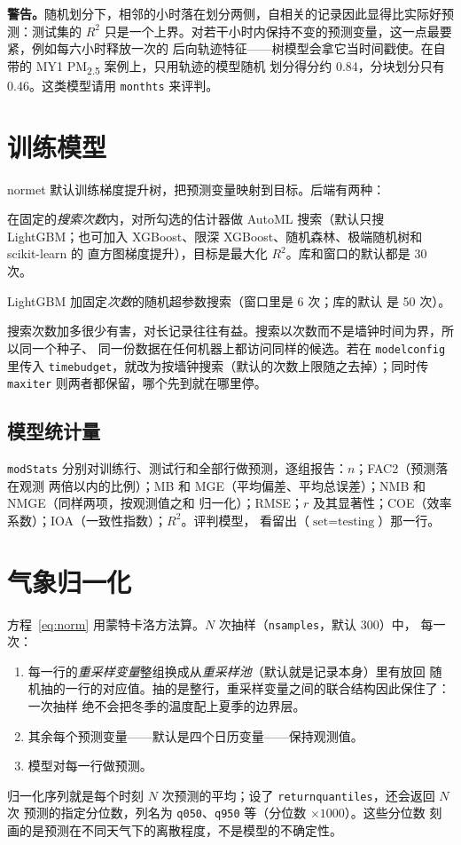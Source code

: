 \documentclass[11pt]{ctexrep}
\newcommand{\nosep}{\setlength{\itemsep}{0pt}\setlength{\parskip}{0pt}\setlength{\topsep}{2pt}}
\newcommand{\nm}{\textsf{normet}}
\newcommand{\codeunderscore}{\textunderscore\allowbreak}
\newcommand{\code}[1]{\texttt{\let\_\codeunderscore #1}}
\newcommand{\PMtwo}{PM\textsubscript{2.5}}
\newcommand{\caution}[1]{\par\noindent\colorbox{warn!15}{\parbox{0.97\linewidth}{\small\textbf{警告。}#1}}\par}
\begin{document}
\caution{随机划分下，相邻的小时落在划分两侧，自相关的记录因此显得比实际好预测：测试集的
$R^2$ 只是一个上界。对若干小时内保持不变的预测变量，这一点最要紧，例如每六小时释放一次的
后向轨迹特征——树模型会拿它当时间戳使。在自带的 MY1 \PMtwo{} 案例上，只用轨迹的模型随机
划分得分约 0.84，分块划分只有 0.46。这类模型请用 \code{month\_ts} 来评判。}

\section{训练模型}\label{sec:train}
\nm{} 默认训练梯度提升树，把预测变量映射到目标。后端有两种：
\begin{description}\nosep
  \item[FLAML] 在固定的\emph{搜索次数}内，对所勾选的估计器做 AutoML 搜索（默认只搜
        LightGBM；也可加入 XGBoost、限深 XGBoost、随机森林、极端随机树和 scikit-learn 的
        直方图梯度提升），目标是最大化 $R^2$。库和窗口的默认都是 30 次。
  \item[LightGBM] LightGBM 加固定\emph{次数}的随机超参数搜索（窗口里是 6 次；库的默认
        是 50 次）。
\end{description}
搜索次数加多很少有害，对长记录往往有益。搜索以次数而不是墙钟时间为界，所以同一个种子、
同一份数据在任何机器上都访问同样的候选。若在 \code{model\_config} 里传入
\code{time\_budget}，就改为按墙钟搜索（默认的次数上限随之去掉）；同时传 \code{max\_iter}
则两者都保留，哪个先到就在哪里停。

\subsection{模型统计量}\label{sec:modstats}
\code{modStats} 分别对训练行、测试行和全部行做预测，逐组报告：$n$；FAC2（预测落在观测
两倍以内的比例）；MB 和 MGE（平均偏差、平均总误差）；NMB 和 NMGE（同样两项，按观测值之和
归一化）；RMSE；$r$ 及其显著性；COE（效率系数）；IOA（一致性指数）；$R^2$。评判模型，
看留出（$\text{set} = \text{testing}$）那一行。

\section{气象归一化}\label{sec:normalise}
方程~\eqref{eq:norm} 用蒙特卡洛方法算。$N$ 次抽样（\code{n\_samples}，默认 300）中，
每一次：
\begin{enumerate}\nosep
  \item 每一行的\emph{重采样变量}整组换成从\emph{重采样池}（默认就是记录本身）里有放回
        随机抽的一行的对应值。抽的是整行，重采样变量之间的联合结构因此保住了：一次抽样
        绝不会把冬季的温度配上夏季的边界层。
  \item 其余每个预测变量——默认是四个日历变量——保持观测值。
  \item 模型对每一行做预测。
\end{enumerate}
归一化序列就是每个时刻 $N$ 次预测的平均；设了 \code{return\_quantiles}，还会返回 $N$ 次
预测的指定分位数，列名为 \code{q050}、\code{q950} 等（分位数 $\times 1000$）。这些分位数
刻画的是预测在不同天气下的离散程度，不是模型的不确定性。
\end{document}
